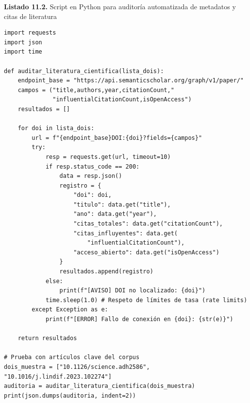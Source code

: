 \begin{tcolorbox}[colback=white, colframe=unmsm_gold, arc=3pt, boxrule=0.8pt, top=0.3cm, bottom=0.3cm, left=0.4cm, right=0.4cm]
\small\sffamily
\textbf{Listado 11.2.} Script en Python para auditoría automatizada de metadatos y citas de literatura
\vspace{0.2cm}
\begin{verbatim}
import requests
import json
import time

def auditar_literatura_cientifica(lista_dois):
    endpoint_base = "https://api.semanticscholar.org/graph/v1/paper/"
    campos = ("title,authors,year,citationCount,"
              "influentialCitationCount,isOpenAccess")
    resultados = []
    
    for doi in lista_dois:
        url = f"{endpoint_base}DOI:{doi}?fields={campos}"
        try:
            resp = requests.get(url, timeout=10)
            if resp.status_code == 200:
                data = resp.json()
                registro = {
                    "doi": doi,
                    "titulo": data.get("title"),
                    "ano": data.get("year"),
                    "citas_totales": data.get("citationCount"),
                    "citas_influyentes": data.get(
                        "influentialCitationCount"),
                    "acceso_abierto": data.get("isOpenAccess")
                }
                resultados.append(registro)
            else:
                print(f"[AVISO] DOI no localizado: {doi}")
            time.sleep(1.0) # Respeto de límites de tasa (rate limits)
        except Exception as e:
            print(f"[ERROR] Fallo de conexión en {doi}: {str(e)}")
            
    return resultados

# Prueba con artículos clave del corpus
dois_muestra = ["10.1126/science.adh2586", "10.1016/j.lindif.2023.102274"]
auditoria = auditar_literatura_cientifica(dois_muestra)
print(json.dumps(auditoria, indent=2))
\end{verbatim}
\end{tcolorbox}

